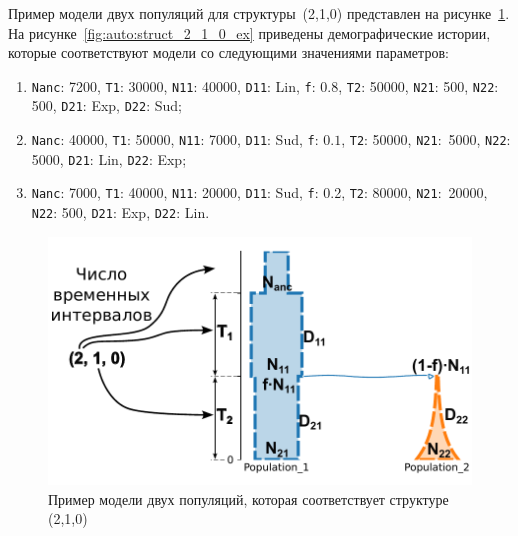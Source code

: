 \documentclass[a4paper,14pt,oneside,openany,article]{memoir}
\begin{document}
Пример модели двух популяций для структуры~(2,1,0) представлен на рисунке~\ref{fig:auto:struct_2_1_0}.
На рисунке~\ref{fig:auto:struct_2_1_0_ex} приведены демографические истории, которые соответствуют модели со следующими значениями параметров:
\begin{enumerate}
    \item \texttt{Nanc}: 7200, \texttt{T1}: 30000, \texttt{N11}: 40000, \texttt{D11}: Lin, \texttt{f}: $0.8$, \texttt{T2}: 50000, \texttt{N21}: 500, \texttt{N22}: 500, \texttt{D21}: Exp, \texttt{D22}: Sud;
    \item \texttt{Nanc}: 40000, \texttt{T1}: 50000, \texttt{N11}: 7000, \texttt{D11}: Sud, \texttt{f}: $0.1$, \texttt{T2}: 50000, \texttt{N21}:~5000, \texttt{N22}: 5000, \texttt{D21}: Lin, \texttt{D22}: Exp;
    \item \texttt{Nanc}: 7000, \texttt{T1}: 40000, \texttt{N11}: 20000, \texttt{D11}: Sud, \texttt{f}: 0.2, \texttt{T2}: 80000, \texttt{N21}:~20000, \texttt{N22}: 500, \texttt{D21}: Exp, \texttt{D22}: Lin.\\
\end{enumerate}

\begin{figure}[h]
    \centering
    \includegraphics[width=0.6\linewidth]{images_2/picture_2pops_str_base.pdf}
    \caption{Пример модели двух популяций, которая соответствует структуре (2,1,0)}
    \label{fig:auto:struct_2_1_0}
\end{figure}
\end{document}
